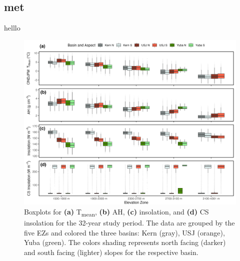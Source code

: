 \hypertarget{ch2-results-1}{\subsection{met}\label{ch2-results-1}}

helllo

\begin{figure}[h]
\centering
\includegraphics[width=\textwidth]{figures/ch2_figs/met4_boxplot_v4.png}
\caption{ Boxplots for \textbf{(a)} T\textsubscript{mean}, \textbf{(b)} AH, \textbf{(c)} insolation, and \textbf{(d)} CS insolation for the 32-year study period. The data are grouped by the five EZs and colored the three basins: Kern (gray), USJ (orange), Yuba (green). The colors shading represents north facing (darker) and south facing (lighter) slopes for the respective basin.}
\label{fig:met_boxplots}
\end{figure}



